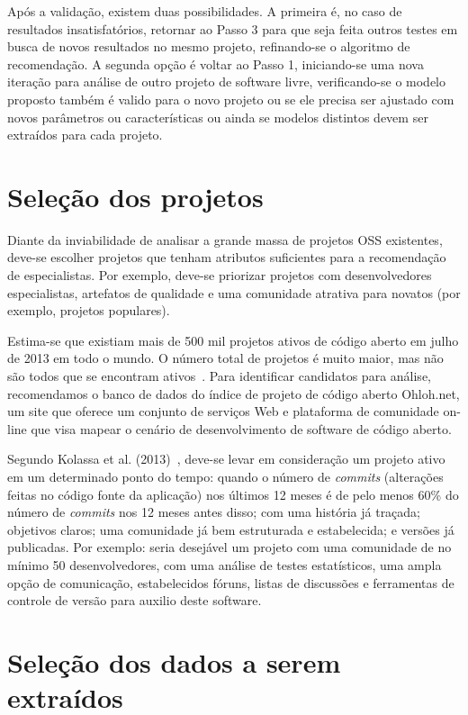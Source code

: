 \documentclass[oneside,brazil,a4paper]{normas-utf-tex}
\begin{document}
Após a validação, existem duas possibilidades. A primeira é, no caso de resultados insatisfatórios, retornar ao Passo 3 para que seja feita outros testes em busca de novos resultados no mesmo projeto, refinando-se o algoritmo de recomendação. A segunda opção é voltar ao Passo 1, iniciando-se uma nova iteração para análise de outro projeto de software livre, verificando-se o modelo proposto também é valido para o novo projeto ou se ele precisa ser ajustado com novos parâmetros ou características ou ainda se modelos distintos devem ser extraídos para cada projeto.
 
\section{Seleção dos projetos}
\label{secao:metodo:selecao}

Diante da inviabilidade de analisar a grande massa de projetos OSS existentes, deve-se escolher projetos que tenham atributos suficientes para a recomendação de especialistas. Por exemplo, deve-se priorizar projetos com desenvolvedores especialistas, artefatos de qualidade e uma comunidade atrativa para novatos (por exemplo, projetos populares).

Estima-se que existiam mais de 500 mil projetos ativos de código aberto em julho de 2013 em todo o mundo. O número total de projetos é muito maior, mas não são todos que se encontram ativos~\cite{daffara}. Para identificar candidatos para análise, recomendamos o banco de dados do índice de projeto de código aberto Ohloh.net, um site que oferece um conjunto de serviços Web e plataforma de comunidade on-line que visa mapear o cenário de desenvolvimento de software de código aberto.

Segundo Kolassa et al. (2013)~\nocite{Kolassa-etal:2013}, deve-se levar em consideração um projeto ativo em um determinado ponto do tempo: quando o número de \textit{commits} (alterações feitas no código fonte da aplicação) nos últimos 12 meses é de pelo menos 60\% do número de \textit{commits} nos 12 meses antes disso; com uma história já traçada; objetivos claros; uma comunidade já bem estruturada e estabelecida; e versões já publicadas. Por exemplo: seria desejável um projeto com uma comunidade de no mínimo 50 desenvolvedores, com uma análise de testes estatísticos, uma ampla opção de comunicação, estabelecidos fóruns, listas de discussões e ferramentas de controle de versão para auxilio deste software.

\section{Seleção dos dados a serem extraídos}
\end{document}
